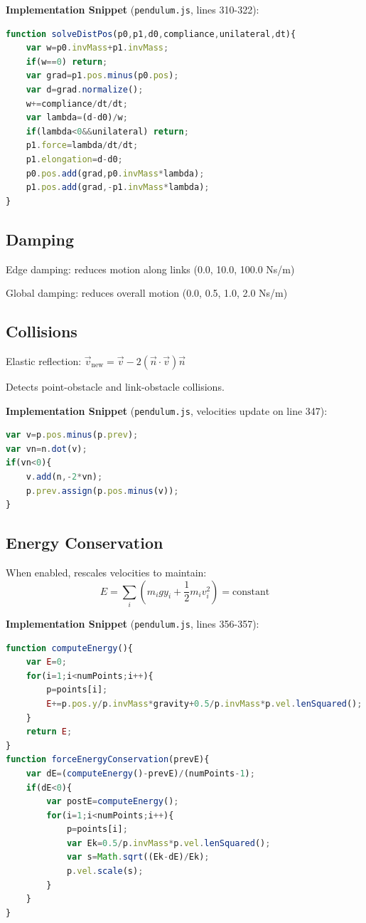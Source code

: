 \documentclass[12pt,a4paper]{article}
\begin{document}
\noindent\textbf{Implementation Snippet} (\texttt{pendulum.js}, lines 310-322):
\begin{lstlisting}[language=JavaScript]
function solveDistPos(p0,p1,d0,compliance,unilateral,dt){
    var w=p0.invMass+p1.invMass;
    if(w==0) return;
    var grad=p1.pos.minus(p0.pos);
    var d=grad.normalize();
    w+=compliance/dt/dt;
    var lambda=(d-d0)/w;
    if(lambda<0&&unilateral) return;
    p1.force=lambda/dt/dt;
    p1.elongation=d-d0;
    p0.pos.add(grad,p0.invMass*lambda);
    p1.pos.add(grad,-p1.invMass*lambda);
}
\end{lstlisting}

\subsection{Damping}

Edge damping: reduces motion along links (0.0, 10.0, 100.0 Ns/m)

Global damping: reduces overall motion (0.0, 0.5, 1.0, 2.0 Ns/m)

\subsection{Collisions}

Elastic reflection: $\vec{v}_{\text{new}} = \vec{v} - 2(\vec{n} \cdot \vec{v})\vec{n}$

Detects point-obstacle and link-obstacle collisions.

\noindent\textbf{Implementation Snippet} (\texttt{pendulum.js}, velocities update on line 347):
\begin{lstlisting}[language=JavaScript]
var v=p.pos.minus(p.prev);
var vn=n.dot(v);
if(vn<0){
    v.add(n,-2*vn);
    p.prev.assign(p.pos.minus(v));
}
\end{lstlisting}

\subsection{Energy Conservation}

When enabled, rescales velocities to maintain:
\begin{equation}
E = \sum_i \left( m_i g y_i + \frac{1}{2}m_i v_i^2 \right) = \text{constant}
\end{equation}

\noindent\textbf{Implementation Snippet} (\texttt{pendulum.js}, lines 356-357):
\begin{lstlisting}[language=JavaScript]
function computeEnergy(){
    var E=0;
    for(i=1;i<numPoints;i++){
        p=points[i];
        E+=p.pos.y/p.invMass*gravity+0.5/p.invMass*p.vel.lenSquared();
    }
    return E;
}
function forceEnergyConservation(prevE){
    var dE=(computeEnergy()-prevE)/(numPoints-1);
    if(dE<0){
        var postE=computeEnergy();
        for(i=1;i<numPoints;i++){
            p=points[i];
            var Ek=0.5/p.invMass*p.vel.lenSquared();
            var s=Math.sqrt((Ek-dE)/Ek);
            p.vel.scale(s);
        }
    }
}
\end{lstlisting}
\end{document}

